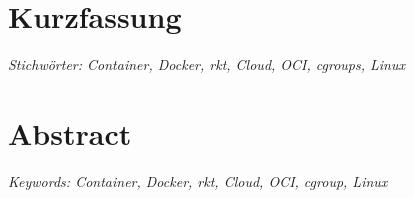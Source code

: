 
\chapter*{Kurzfassung}
\thispagestyle{front}
\label{chap:kurzfassung}
\textit{Stichwörter: Container, Docker, rkt, Cloud, OCI, cgroups, Linux}
\begingroup
\let\cleardoublepage\relax
\chapter*{Abstract}
\thispagestyle{front}
\label{chap:Abstract}
\textit{Keywords: Container, Docker, rkt, Cloud, OCI, cgroup, Linux}
\endgroup